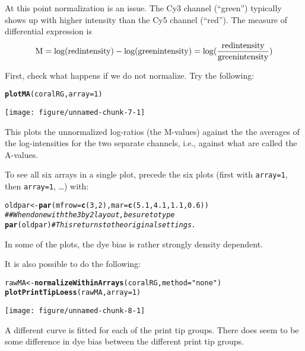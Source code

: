 \documentclass[a4paper,9pt]{article}\usepackage[]{graphicx}\usepackage[]{color}
\makeatletter
\def\maxwidth{ %
  \ifdim\Gin@nat@width>\linewidth
    \linewidth
  \else
    \Gin@nat@width
  \fi
}
\newcommand{\hlnum}[1]{\textcolor[rgb]{0.686,0.059,0.569}{#1}}%
\newcommand{\hlstr}[1]{\textcolor[rgb]{0.192,0.494,0.8}{#1}}%
\newcommand{\hlcom}[1]{\textcolor[rgb]{0.678,0.584,0.686}{\textit{#1}}}%
\newcommand{\hlstd}[1]{\textcolor[rgb]{0.345,0.345,0.345}{#1}}%
\newcommand{\hlkwb}[1]{\textcolor[rgb]{0.69,0.353,0.396}{#1}}%
\newcommand{\hlkwc}[1]{\textcolor[rgb]{0.333,0.667,0.333}{#1}}%
\newcommand{\hlkwd}[1]{\textcolor[rgb]{0.737,0.353,0.396}{\textbf{#1}}}%
\newenvironment{kframe}{%
 \def\at@end@of@kframe{}%
 \ifinner\ifhmode%
  \def\at@end@of@kframe{\end{minipage}}%
  \begin{minipage}{\columnwidth}%
 \fi\fi%
 \def\FrameCommand##1{\hskip\@totalleftmargin \hskip-\fboxsep
 \colorbox{shadecolor}{##1}\hskip-\fboxsep
     \hskip-\linewidth \hskip-\@totalleftmargin \hskip\columnwidth}%
 \MakeFramed {\advance\hsize-\width
   \@totalleftmargin\z@ \linewidth\hsize
   \@setminipage}}%
 {\par\unskip\endMakeFramed%
 \at@end@of@kframe}
\newenvironment{knitrout}{}{} %
\makeatother
\begin{document}
At this point normalization is an issue.  The Cy3 channel (``green'')
typically shows up with higher intensity than the Cy5 channel
(``red'').  The measure of differential expression is\[
{\rm M} = \log({\rm red intensity}) - \log({\rm green intensity}) =
\log(\frac{\displaystyle \rm red intensity}
{\displaystyle \rm green intensity})
\]

First, check what happens if we do not normalize.
Try the following:
\begin{knitrout}
\color{fgcolor}\begin{kframe}
\begin{alltt}
\hlkwd{plotMA}\hlstd{(coralRG,} \hlkwc{array}\hlstd{=}\hlnum{1}\hlstd{)}
\end{alltt}
\end{kframe}
\texttt{[image: figure/unnamed-chunk-7-1]} 

\end{knitrout}
This plots the unnormalized log-ratios (the M-values) against the
the averages of the log-intensities for the two separate channels,
i.e., against what are called the A-values.

To see all six arrays in a single plot, precede the six plots
(first with \texttt{array=1}, then \texttt{array=1}, \ldots)
with:
\begin{knitrout}
\color{fgcolor}\begin{kframe}
\begin{alltt}
\hlstd{oldpar} \hlkwb{<-} \hlkwd{par}\hlstd{(}\hlkwc{mfrow}\hlstd{=}\hlkwd{c}\hlstd{(}\hlnum{3}\hlstd{,}\hlnum{2}\hlstd{),} \hlkwc{mar}\hlstd{=}\hlkwd{c}\hlstd{(}\hlnum{5.1}\hlstd{,} \hlnum{4.1}\hlstd{,} \hlnum{1.1}\hlstd{,} \hlnum{0.6}\hlstd{))}
\hlcom{## When done with the 3 by 2 layout, be sure to type}
\hlkwd{par}\hlstd{(oldpar)}     \hlcom{# This returns to the original settings.}
\end{alltt}
\end{kframe}
\end{knitrout}
In some of the plots, the dye bias is rather strongly density dependent.

It is also possible to do the following:
\begin{knitrout}
\color{fgcolor}\begin{kframe}
\begin{alltt}
\hlstd{rawMA} \hlkwb{<-} \hlkwd{normalizeWithinArrays}\hlstd{(coralRG,} \hlkwc{method} \hlstd{=} \hlstr{"none"}\hlstd{)}
\hlkwd{plotPrintTipLoess}\hlstd{(rawMA,} \hlkwc{array}\hlstd{=}\hlnum{1}\hlstd{)}
\end{alltt}
\end{kframe}
\texttt{[image: figure/unnamed-chunk-8-1]} 

\end{knitrout}
A different curve is fitted for each of the print tip groups.
There does seem to be some difference in dye bias between the
different print tip groups.
\end{document}
